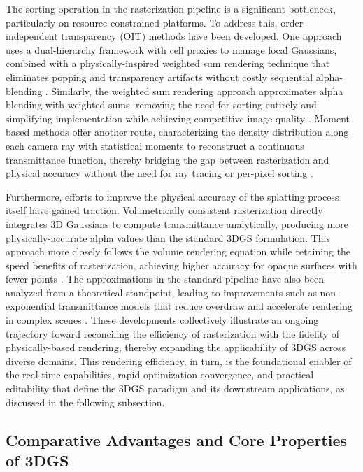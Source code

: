 \documentclass[11pt]{article}
\begin{document}
The sorting operation in the rasterization pipeline is a significant bottleneck, particularly on resource-constrained platforms. To address this, order-independent transparency (OIT) methods have been developed. One approach uses a dual-hierarchy framework with cell proxies to manage local Gaussians, combined with a physically-inspired weighted sum rendering technique that eliminates popping and transparency artifacts without costly sequential alpha-blending \cite{ref32}. Similarly, the weighted sum rendering approach approximates alpha blending with weighted sums, removing the need for sorting entirely and simplifying implementation while achieving competitive image quality \cite{ref33}. Moment-based methods offer another route, characterizing the density distribution along each camera ray with statistical moments to reconstruct a continuous transmittance function, thereby bridging the gap between rasterization and physical accuracy without the need for ray tracing or per-pixel sorting \cite{ref34}.

Furthermore, efforts to improve the physical accuracy of the splatting process itself have gained traction. Volumetrically consistent rasterization directly integrates 3D Gaussians to compute transmittance analytically, producing more physically-accurate alpha values than the standard 3DGS formulation. This approach more closely follows the volume rendering equation while retaining the speed benefits of rasterization, achieving higher accuracy for opaque surfaces with fewer points \cite{ref35}. The approximations in the standard pipeline have also been analyzed from a theoretical standpoint, leading to improvements such as non-exponential transmittance models that reduce overdraw and accelerate rendering in complex scenes \cite{ref36}. These developments collectively illustrate an ongoing trajectory toward reconciling the efficiency of rasterization with the fidelity of physically-based rendering, thereby expanding the applicability of 3DGS across diverse domains. This rendering efficiency, in turn, is the foundational enabler of the real-time capabilities, rapid optimization convergence, and practical editability that define the 3DGS paradigm and its downstream applications, as discussed in the following subsection.

\subsection{Comparative Advantages and Core Properties of 3DGS}
\end{document}
